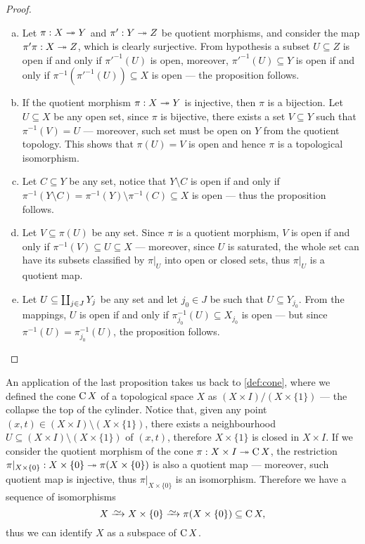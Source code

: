 \begin{proof}
\begin{enumerate}[(a)]\setlength\itemsep{0em}
\item Let \(\pi: X \twoheadrightarrow Y\) and \(\pi': Y \twoheadrightarrow Z\) be quotient morphisms, and
  consider the map \(\pi' \pi: X \twoheadrightarrow Z\), which is clearly surjective. From
  hypothesis a subset \(U \subseteq Z\) is open if and only if \(\pi'^{-1}(U)\)
  is open, moreover, \(\pi'^{-1}(U) \subseteq Y\) is open if and only if
  \(\pi^{-1}(\pi'^{-1}(U)) \subseteq X\) is open --- the proposition follows.
\item If the quotient morphism \(\pi: X \twoheadrightarrow Y\) is injective, then \(\pi\) is a
  bijection. Let \(U \subseteq X\) be any open set, since \(\pi\) is bijective,
  there exists a set \(V \subseteq Y\) such that \(\pi^{-1}(V) = U\) ---
  moreover, such set must be open on \(Y\) from the quotient topology. This
  shows that \(\pi(U) = V\) is open and hence \(\pi\) is a topological
  isomorphism.
\item Let \(C \subseteq Y\) be any set, notice that \(Y \setminus C\) is open
  if and only if \(\pi^{-1}(Y \setminus C) = \pi^{-1}(Y) \setminus \pi^{-1}(C)
  \subseteq X\) is open --- thus the proposition follows.
\item Let \(V \subseteq \pi(U)\) be any set. Since \(\pi\) is a quotient
  morphism, \(V\) is open if and only if \(\pi^{-1}(V) \subseteq U \subseteq
  X\) --- moreover, since \(U\) is saturated, the whole set can have its subsets
  classified by \(\pi|_U\) into open or closed sets, thus \(\pi|_U\) is a
  quotient map.
\item Let \(U \subseteq \coprod_{j \in J} Y_j\) be any set and let \(j_{0} \in
  J\) be such that \(U \subseteq Y_{j_0}\). From the mappings, \(U\) is open if
  and only if \(\pi^{-1}_{j_0}(U) \subseteq X_{j_0}\) is open --- but since
  \(\pi^{-1}(U) = \pi^{-1}_{j_0}(U)\), the proposition follows.
\end{enumerate}
\end{proof}

\begin{example}[Cones]
\label{exp:remove-section-cone-isomorphism}
An application of the last proposition takes us back to \cref{def:cone}, where
we defined the cone \(\operatorname{C} X\) of a topological space \(X\) as \((X \times I) /
(X \times \{1\})\) --- the collapse the top of the cylinder. Notice that, given
any point \((x, t) \in (X \times I) \setminus (X \times \{1\})\), there exists a
neighbourhood \(U \subseteq (X \times I) \setminus (X \times \{1\})\) of \((x,
t)\), therefore \(X \times \{1\}\) is closed in \(X \times I\). If we consider
the quotient morphism of the cone \(\pi: X \times I \twoheadrightarrow \operatorname{C} X\), the
restriction \(\pi|_{X \times \{0\}}: X \times \{0\} \twoheadrightarrow \pi(X \times \{0\})\)
is also a quotient map --- moreover, such quotient map is injective, thus
\(\pi|_{X \times \{0\}}\) is an isomorphism. Therefore we have a sequence of
isomorphisms
\[
  X \isoto X \times \{0\} \isoto \pi(X \times \{0\}) \subseteq \Cone X,
\]
thus we can identify \(X\) as a subspace of \(\operatorname{C} X\).
\end{example}

